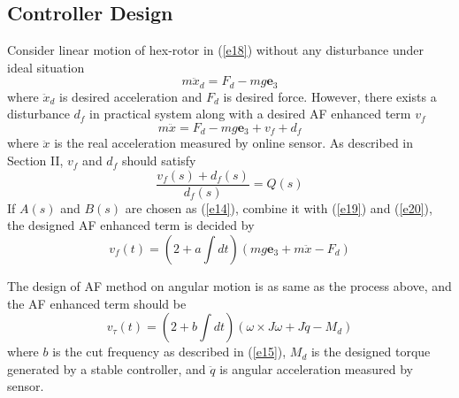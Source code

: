\documentclass[letterpaper, 10 pt, conference]{ieeeconf}  %
\begin{document}
\subsection{Controller Design}

Consider linear motion of hex-rotor in (\ref{e18}) without any disturbance under ideal situation
\begin{equation}
    m\ddot{x}_d = F_d - mg\bm{e}_3
    \label{e19}
\end{equation}
where $\ddot{x}_d$ is desired acceleration and $F_d$ is desired force. However, there exists a disturbance $d_f$ in practical system along with a desired AF enhanced term $v_f$
\begin{equation}
    m\ddot{x} = F_d - mg\bm{e}_3 + v_f + d_f
    \label{e20}
\end{equation}
where $\ddot{x}$ is the real acceleration measured by online sensor.
As described in Section II, $v_f$ and $d_f$ should satisfy
\begin{equation}
    \frac{v_f(s)+d_f(s)}{d_f(s)} = Q(s)
    \label{e21}
\end{equation}
If $A(s)$ and $B(s)$ are chosen as (\ref{e14}), combine it with (\ref{e19}) and (\ref{e20}), the designed AF enhanced term is decided by
\begin{equation}
    v_f(t) = (2+a\int dt)(mg\bm{e}_3 + m\ddot{x} - F_d)
    \label{e22}
\end{equation}

The design of AF method on angular motion is as same as the process above, and the AF enhanced term should be
\begin{equation}
    v_\tau(t) = (2+b\int dt)(\omega\times J\omega + J\ddot{q} - M_d)
    \label{e23}
\end{equation}
where $b$ is the cut frequency as described in (\ref{e15}), $M_d$ is the designed torque generated by a stable controller, and $\ddot{q}$ is angular acceleration measured by sensor.
\end{document}

